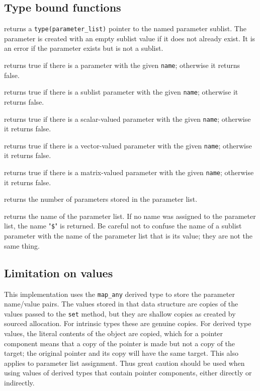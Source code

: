 \documentclass[11pt]{article}
\begin{document}
\subsection{Type bound functions}
\begin{description}[style=nextline]\setlength{\itemsep}{0pt}
\item[\texttt{sublist(name \Lbr,stat \Lbr,errmsg\Rbr\Rbr)}]
  returns a \texttt{type(parameter_list)} pointer to the named parameter
  sublist.  The parameter is created with an empty sublist value if it
  does not already exist.  It is an error if the parameter exists but is
  not a sublist.
\item[\texttt{is_parameter(name)}]
  returns true if there is a parameter with the given \texttt{name};
  otherwise it returns false.
\item[\texttt{is_sublist(name)}]
  returns true if there is a sublist parameter with the given \texttt{name};
  otherwise it returns false.
\item[\texttt{is_scalar(name)}]
  returns true if there is a scalar-valued parameter with the given \texttt{name};
  otherwise it returns false.
\item[\texttt{is_vector(name)}]
  returns true if there is a vector-valued parameter with the given \texttt{name};
  otherwise it returns false.
\item[\texttt{is_matrix(name)}]
  returns true if there is a matrix-valued parameter with the given \texttt{name};
  otherwise it returns false.
\item[\texttt{count()}]
  returns the number of parameters stored in the parameter list.
\item[\texttt{name()}]
  returns the name of the parameter list.  If no name was assigned to the
  parameter list, the name "\texttt{\$}" is returned.  Be careful not
  to confuse the name of a sublist parameter with the name of the parameter
  list that is its value; they are not the same thing.
\end{description}

\subsection{Limitation on values}
This implementation uses the \texttt{map_any} derived type to store the
parameter name/value pairs.  The values stored in that data structure are
copies of the values passed to the \texttt{set} method, but they are shallow
copies as created by sourced allocation.  For intrinsic types these are
genuine copies.  For derived type values, the literal contents of the object
are copied, which for a pointer component means that a copy of the pointer
is made but not a copy of the target; the original pointer and its copy will
have the same target.  This also applies to parameter list assignment.
Thus great caution should be used when using values of derived types that
contain pointer components, either directly or indirectly.
\end{document}
